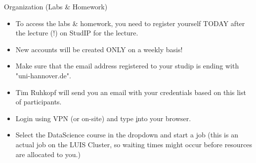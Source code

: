 \documentclass[aspectratio=169,handout]{../latex_main/tntbeamer}  %
\begin{document}
\begin{frame}[c]{Organization (Labs \& Homework)}

\vspace{-1em}
\begin{itemize}
    \item To access the labs \& homework, you need to  \alert{register yourself TODAY after the lecture (!) on StudIP for the lecture}. 
    \item \alert{New accounts will be created ONLY on a weekly basis!}
    \item Make sure that the email address registered to your studip is ending with "uni-hannover.de".
    \item Tim Ruhkopf will send you an email with your credentials based on this list of participants. 
    \item Login using VPN (or on-site) and type  \href{https://jupyterhub.cluster.uni-hannover.de/} into your browser.
    \item Select the DataScience course in the dropdown and start a job 
    (this is an actual job on the LUIS Cluster, so waiting times might occur before resources are allocated to you.)
\end{itemize}

\end{frame}

\end{document}
